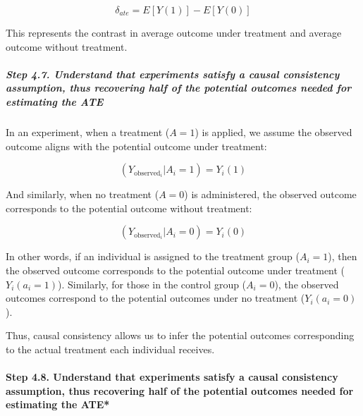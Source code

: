 \documentclass[
  singlecolumn]{article}
\let\oldparagraph\paragraph
\renewcommand{\paragraph}[1]{\oldparagraph{#1}\mbox{}}
\let\oldsubparagraph\subparagraph
\renewcommand{\subparagraph}[1]{\oldsubparagraph{#1}\mbox{}}
\begin{document}
\[
\delta_{ate} = E[Y(1)] - E[Y(0)]
\]

This represents the contrast in average outcome under treatment and
average outcome without treatment.

\hypertarget{step-4.7.-understand-that-experiments-satisfy-a-causal-consistency-assumption-thus-recovering-half-of-the-potential-outcomes-needed-for-estimating-the-ate}{%
\subparagraph{\texorpdfstring{\textbf{Step 4.7. Understand that
experiments satisfy a causal consistency assumption, thus recovering
half of the potential outcomes needed for estimating the
ATE}}{Step 4.7. Understand that experiments satisfy a causal consistency assumption, thus recovering half of the potential outcomes needed for estimating the ATE}}\label{step-4.7.-understand-that-experiments-satisfy-a-causal-consistency-assumption-thus-recovering-half-of-the-potential-outcomes-needed-for-estimating-the-ate}}

In an experiment, when a treatment (\(A = 1\)) is applied, we assume the
observed outcome aligns with the potential outcome under treatment:

\[
(Y_{\text{observed}_i}|A_i = 1) = Y_i(1)
\]

And similarly, when no treatment (\(A = 0\)) is administered, the
observed outcome corresponds to the potential outcome without treatment:

\[
(Y_{\text{observed}_i}|A_i = 0) = Y_i(0)
\]

In other words, if an individual is assigned to the treatment group
(\(A_i = 1\)), then the observed outcome corresponds to the potential
outcome under treatment (\(Y_i(a_i = 1)\)). Similarly, for those in the
control group (\(A_i = 0\)), the observed outcomes correspond to the
potential outcomes under no treatment (\(Y_i(a_i = 0)\)).

Thus, causal consistency allows us to infer the potential outcomes
corresponding to the actual treatment each individual receives.

\hypertarget{step-4.8.-understand-that-experiments-satisfy-a-causal-consistency-assumption-thus-recovering-half-of-the-potential-outcomes-needed-for-estimating-the-ate}{%
\paragraph{\texorpdfstring{\textbf{Step 4.8. Understand that experiments
satisfy a causal consistency assumption, thus recovering half of the
potential outcomes needed for estimating the
ATE}*}{Step 4.8. Understand that experiments satisfy a causal consistency assumption, thus recovering half of the potential outcomes needed for estimating the ATE*}}\label{step-4.8.-understand-that-experiments-satisfy-a-causal-consistency-assumption-thus-recovering-half-of-the-potential-outcomes-needed-for-estimating-the-ate}}
\end{document}
